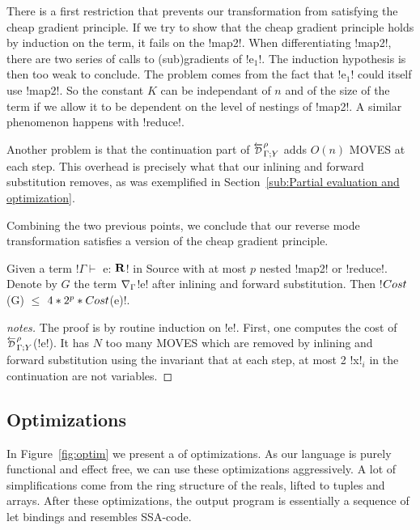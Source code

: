 There is a first restriction that prevents our transformation from satisfying the cheap gradient principle.
If we try to show that the cheap gradient principle holds by induction on the term, it fails on the !map2!.
When differentiating !map2!, there are two series of calls to (sub)gradients of !e$_1$!. 
The induction hypothesis is then too weak to conclude. 
The problem comes from the fact that !e$_1$! could itself use !map2!. 
So the constant $K$ can be independant of $n$ and of 
the size of the term if we allow it to be dependent on the level of nestings of !map2!.
A similar phenomenon happens with !reduce!.

Another problem is that the continuation part of $\directD{\rho}{\Gamma}{Y}$ adds $O(n)$ MOVES at each step.
This overhead is precisely what that our inlining and forward substitution removes, 
as was exemplified in Section~\ref{sub:Partial evaluation and optimization}.

Combining the two previous points, we conclude that our reverse mode transformation satisfies a version of the cheap gradient principle.

\begin{theorem}
    Given a term !$\Gamma \vdash$ e: $\mathbf{R}$! in Source with at most $p$ nested !map2! or !reduce!. 
    Denote by $G$ the term $\nabla_\Gamma$!e! after inlining and forward substitution.
    Then !$Cost$(G) $\leq$ $4*2^{p}*Cost$(e)!.
\end{theorem}

\begin{proof}[notes]
    The proof is by routine induction on !e!. 
    First, one computes the cost of $\directD{\rho}{\Gamma}{Y}$(!e!).
    It has $N$ too many MOVES which are removed by inlining and forward substitution using the invariant that at each step, 
    at most 2 !x!$_i$ in the continuation are not variables.
\end{proof}

\subsection{Optimizations} %
\label{sub:Optimizations}

In Figure~\ref{fig:optim} we present a of optimizations. 
As our language is purely functional and effect free, 
we can use these optimizations aggressively. 
A lot of simplifications come from the ring structure of the reals, lifted to tuples and arrays.
After these optimizations, the output program is essentially a sequence of let bindings 
and resembles SSA-code.

